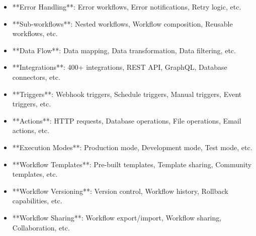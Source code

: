 \documentclass[11pt,a4paper]{article}
\begin{document}
\begin{itemize}
\item **Error Handling**: Error workflows, Error notifications, Retry logic, etc.
\end{itemize}

\begin{itemize}
\item **Sub-workflows**: Nested workflows, Workflow composition, Reusable workflows, etc.
\end{itemize}

\begin{itemize}
\item **Data Flow**: Data mapping, Data transformation, Data filtering, etc.
\end{itemize}

\begin{itemize}
\item **Integrations**: 400+ integrations, REST API, GraphQL, Database connectors, etc.
\end{itemize}

\begin{itemize}
\item **Triggers**: Webhook triggers, Schedule triggers, Manual triggers, Event triggers, etc.
\end{itemize}

\begin{itemize}
\item **Actions**: HTTP requests, Database operations, File operations, Email actions, etc.
\end{itemize}

\begin{itemize}
\item **Execution Modes**: Production mode, Development mode, Test mode, etc.
\end{itemize}

\begin{itemize}
\item **Workflow Templates**: Pre-built templates, Template sharing, Community templates, etc.
\end{itemize}

\begin{itemize}
\item **Workflow Versioning**: Version control, Workflow history, Rollback capabilities, etc.
\end{itemize}

\begin{itemize}
\item **Workflow Sharing**: Workflow export/import, Workflow sharing, Collaboration, etc.
\end{itemize}
\end{document}
